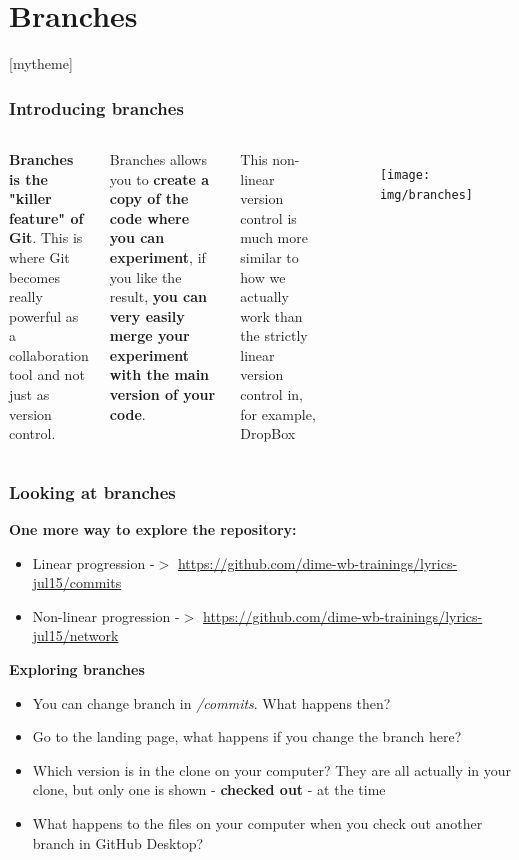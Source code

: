 \documentclass[aspectratio=169]{beamer}
\newcommand{\sectionpic}[2]{
	\section{#1}
	\setbeamertemplate{section page}[mytheme]
}
\newcommand{\trainingURL}[1]{{\color{blue}\url{#1}}}
\newcommand{\traininerUsername}{dime-wb-trainings}
\newcommand{\repoName}{\traininerUsername/lyrics-jul15}
\newcommand{\trainingRepoURLwithParameter}[1]{\trainingURL{https://github.com/\repoName#1}}
\begin{document}
\sectionpic{Branches}{}

\begin{frame}
\frametitle{Introducing branches}

	\begin{columns}[c]

		\textbf{Branches is the "killer feature" of Git}. This is where Git becomes really powerful as a collaboration tool and not just as version control.

		\vspace{.25cm}

		Branches allows you to \textbf{create a copy of the code where you can experiment}, if you like the result, \textbf{you can very easily merge your experiment with the main version of your code}.

		\vspace{.25cm}

		This non-linear version control is much more similar to how we actually work than the strictly linear version control in, for example, DropBox

		\begin{figure}
			\centering
			\texttt{[image: img/branches]}
			\label{fig:branches}
		\end{figure}

	\end{columns}

\end{frame}

\begin{frame}
\frametitle{Looking at branches}


	\textbf{One more way to explore the repository:}
	\begin{itemize}
		\item Linear progression -$>$ \trainingRepoURLwithParameter{/commits}  
		\item Non-linear progression -$>$ \trainingRepoURLwithParameter{/network} 
	\end{itemize}

	\vspace{.05cm}

	\textbf{Exploring branches}
	\begin{itemize}
		\item You can change branch in \textit{/commits}. What happens then?
		\item Go to the landing page, what happens if you change the branch here?
		\item Which version is in the clone on your computer? They are all actually in your clone, but only one is shown - \textbf{checked out} - at the time
		\item What happens to the files on your computer when you check out another branch in GitHub Desktop?
	\end{itemize}

\end{frame}
\end{document}
